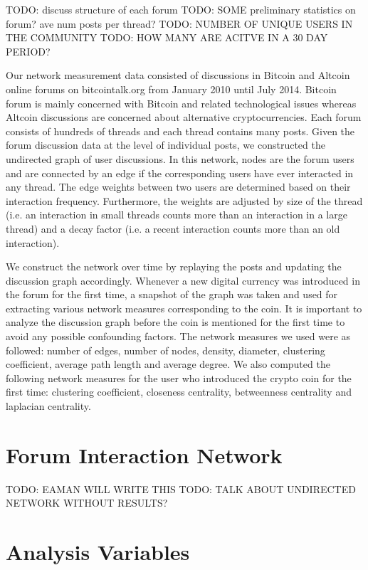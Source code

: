 TODO: discuss structure of each forum
TODO: SOME preliminary statistics on forum? ave num posts per thread?
TODO: NUMBER OF UNIQUE USERS IN THE COMMUNITY
TODO: HOW MANY ARE ACITVE IN A 30 DAY PERIOD?

Our network measurement data consisted of discussions in Bitcoin and Altcoin
online forums on bitcointalk.org from January 2010 until July 2014.  Bitcoin
forum is mainly concerned with Bitcoin and related technological issues whereas
Altcoin discussions are concerned about alternative cryptocurrencies. Each
forum consists of hundreds of threads and each thread contains many posts.
Given the forum discussion data at the level of individual posts, we
constructed the undirected graph of user discussions. In this network, nodes
are the forum users and are connected by an edge if the corresponding users
have ever interacted in any thread. The edge weights between two users are
determined based on their interaction frequency. Furthermore, the weights are
adjusted by size of the thread (i.e. an interaction in small threads counts
more than an interaction in a large thread) and a decay factor (i.e. a recent
interaction counts more than an old interaction).

We construct the network over time by replaying the posts and updating the
discussion graph accordingly.  Whenever a new digital currency was introduced
in the forum for the first time, a snapshot of the graph was taken and used for
extracting various network measures corresponding to the coin. It is important
to analyze the discussion graph before the coin is mentioned for the first time
to avoid any possible confounding factors. The network measures we used were as
followed: number of edges, number of nodes, density, diameter, clustering
coefficient, average path length and average degree. We also computed the
following network measures for the user who introduced the crypto coin for the
first time: clustering coefficient, closeness centrality, betweenness
centrality and laplacian centrality.

\section{Forum Interaction Network}
TODO: EAMAN WILL WRITE THIS
TODO: TALK ABOUT UNDIRECTED NETWORK WITHOUT RESULTS?



\section{Analysis Variables}
